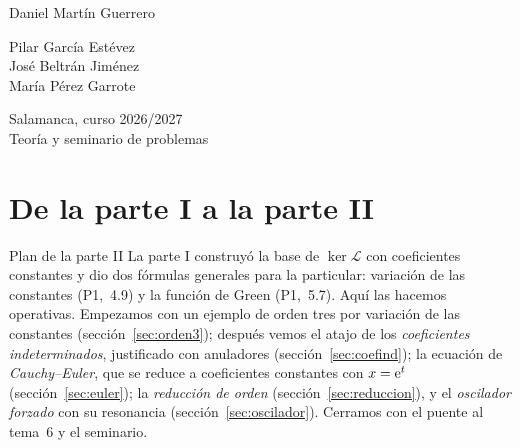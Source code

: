 \documentclass[11pt,twoside]{article}
\newcommand\Lop{\mathcal L}
\newcommand\pI[1]{(P1,~#1)}
\begin{document}
\begin{titlepage}
\begin{minipage}[t]{0.32\textwidth}
{\color{acc}\footnotesize{}}\par\vspace{2pt}
{\small Daniel Martín Guerrero}
\end{minipage}\hfill
\begin{minipage}[t]{0.32\textwidth}\centering
{\color{acc}\footnotesize{}}\par\vspace{2pt}
{\small Pilar García Estévez\\ José Beltrán Jiménez\\ María Pérez Garrote}
\end{minipage}\hfill
\begin{minipage}[t]{0.32\textwidth}\raggedleft
{\color{acc}\footnotesize{}}\par\vspace{2pt}
{\small Salamanca, curso 2026/2027}\\[1pt]
{\footnotesize\color{muted}Teoría y seminario de problemas}
\end{minipage}
\end{titlepage}

\setcounter{page}{31}
{\hypersetup{linkcolor=fg}\tableofcontents}
\clearpage

\section{De la parte I a la parte II}\label{sec:intro}

\begin{motivacion}{Plan de la parte II}
La parte I construyó la base de $\ker\Lop$ con coeficientes constantes y dio dos fórmulas generales para la
particular: variación de las constantes \pI{4.9} y la función de Green \pI{5.7}. Aquí las hacemos operativas.
Empezamos con un ejemplo de orden tres por variación de las constantes (sección~\ref{sec:orden3}); después
vemos el atajo de los \emph{coeficientes indeterminados}, justificado con anuladores (sección~\ref{sec:coefind}); la
ecuación de \emph{Cauchy--Euler}, que se reduce a coeficientes constantes con $x=\mathrm{e}^t$ (sección~\ref{sec:euler}); la
\emph{reducción de orden} (sección~\ref{sec:reduccion}), y el \emph{oscilador forzado} con su resonancia
(sección~\ref{sec:oscilador}). Cerramos con el puente al tema~6 y el seminario.
\end{motivacion}
\end{document}
